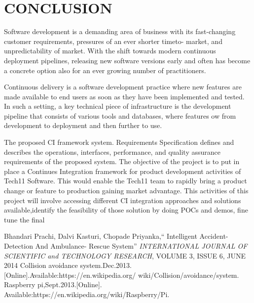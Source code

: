 \documentclass[12pt,a4paper,oneside]{report}
\newcommand{\quotes}[1]{``#1''}
\begin{document}
{\chapter{CONCLUSION}
\par 
Software development is a demanding area of business with its
fast-changing customer requirements, pressures of an ever shorter timeto- market, and unpredictability
of market. With the shift towards modern continuous deployment pipelines, releasing
new software versions early and often has become a concrete option also for an ever
growing number of practitioners. \par Continuous delivery is a software development practice where new features are made
available to end users as soon as they have been implemented and tested. In such a setting, a
key technical piece of infrastructure is the development pipeline that consists of various tools
and databases, where features ow from development to deployment and then further to use.
\par
The proposed CI framework system. Requirements Specification defines and describes the operations, interfaces,
performance, and quality assurance requirements of the proposed system. 
The objective of the project is to put in place a Continues Integration framework for
product development activities of Tech11 Software. This would enable the Tech11 team to
rapidly bring a product change or feature to production gaining market advantage. This activities
of this project will involve accessing different CI integration approaches and solutions
available,identify the feasibility of those solution by doing POCs and demos, fine tune the final

\renewcommand{\bibname}{\uppercase{REFERENCES}}
\begin{thebibliography}{999}


 Bhandari Prachi, Dalvi Kasturi, Chopade Priyanka,\quotes{ Intelligent Accident-Detection And Ambulance- Rescue System} \textit{INTERNATIONAL JOURNAL OF SCIENTIFIC and TECHNOLOGY RESEARCH}, VOLUME 3, ISSUE 6, JUNE 2014
 Collision avoidance system.Dec.2013.[Online].Available:https://en.wikipedia.org/ wiki/Collision/avoidance/system.
 Raspberry pi,Sept.2013.[Online]. Available:https://en.wikipedia.org/wiki/Raspberry/Pi.




\end{thebibliography}
}
\end{document}
